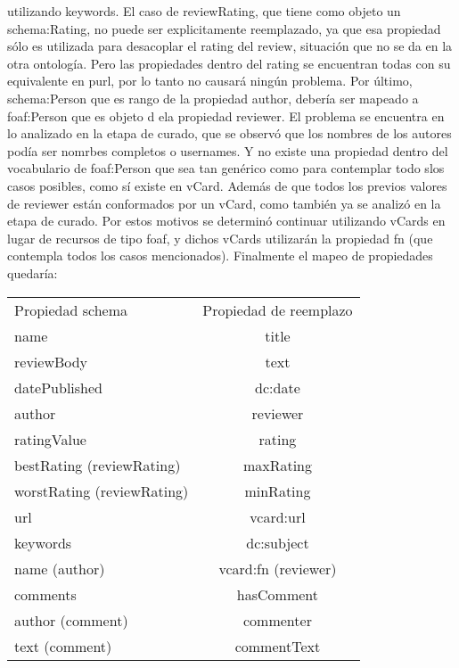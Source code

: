 utilizando keywords.
El caso de reviewRating, que tiene como objeto un schema:Rating, no puede ser explicitamente reemplazado, ya que esa propiedad 
sólo es utilizada para desacoplar el rating del review, situación que no se da en la otra ontología. Pero las propiedades dentro del rating se encuentran todas 
con su equivalente en purl, por lo tanto no causará ningún problema.
Por último, schema:Person que es rango de la propiedad author, debería ser mapeado a foaf:Person que es objeto d ela propiedad reviewer. 
El problema se encuentra en lo analizado en la etapa de curado, que se observó que los nombres de los autores podía ser nomrbes completos o usernames. 
Y no existe una propiedad dentro del vocabulario de foaf:Person que sea tan genérico como para contemplar todo slos casos posibles, como sí existe en vCard.
Además de que todos los previos valores de reviewer están conformados por un vCard, como también ya se analizó en la etapa de curado.
Por estos motivos se determinó continuar utilizando vCards en lugar de recursos de tipo foaf, y dichos vCards utilizarán la propiedad
fn (que contempla todos los casos mencionados).
Finalmente el mapeo de propiedades quedaría:\\
\begin{tabular}{| l | c |}
Propiedad schema & Propiedad de reemplazo\\
name & title \\
reviewBody & text \\
datePublished & dc:date \\
author & reviewer \\
ratingValue & rating\\
bestRating (reviewRating) & maxRating\\
worstRating (reviewRating)& minRating\\
url & vcard:url\\
keywords & dc:subject\\
name (author) & vcard:fn (reviewer)\\
comments & hasComment\\
author (comment) & commenter \\
text (comment) & commentText 
\end{tabular}